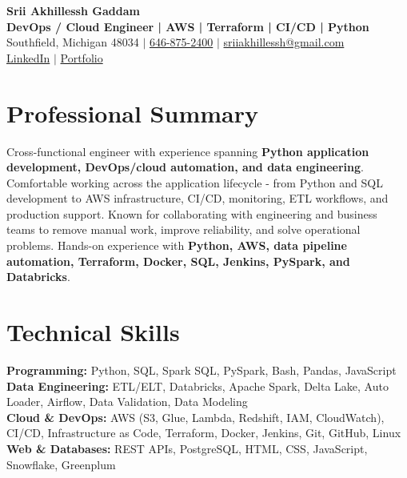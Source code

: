 \documentclass[letterpaper,10pt]{article}
\begin{document}
\fontsize{9.35pt}{10.45pt}\selectfont

\begin{center}
    {\LARGE \textbf{Srii Akhillessh Gaddam}} \\[-1pt]
    \textbf{DevOps / Cloud Engineer | AWS | Terraform | CI/CD | Python} \\[2pt]
    Southfield, Michigan 48034 $|$
    \href{tel:6468752400}{646-875-2400} $|$
    \href{mailto:sriiakhillessh@gmail.com}{sriiakhillessh@gmail.com} \\[1pt]
    \href{https://www.linkedin.com/in/srii-akhiilessh-gaddam-b48668191/}{LinkedIn} $|$
    \href{https://sriiakhillesshg.github.io/portfolio/}{Portfolio}
\end{center}
\vspace{-8pt}

\section{Professional Summary}
\small{Cross-functional engineer with experience spanning \textbf{Python application development, DevOps/cloud automation, and data engineering}. Comfortable working across the application lifecycle - from Python and SQL development to AWS infrastructure, CI/CD, monitoring, ETL workflows, and production support. Known for collaborating with engineering and business teams to remove manual work, improve reliability, and solve operational problems. Hands-on experience with \textbf{Python, AWS, data pipeline automation, Terraform, Docker, SQL, Jenkins, PySpark, and Databricks}.}

\section{Technical Skills}
\small{
\textbf{Programming:} Python, SQL, Spark SQL, PySpark, Bash, Pandas, JavaScript \\
\textbf{Data Engineering:} ETL/ELT, Databricks, Apache Spark, Delta Lake, Auto Loader, Airflow, Data Validation, Data Modeling \\
\textbf{Cloud \& DevOps:} AWS (S3, Glue, Lambda, Redshift, IAM, CloudWatch), CI/CD, Infrastructure as Code, Terraform, Docker, Jenkins, Git, GitHub, Linux \\
\textbf{Web \& Databases:} REST APIs, PostgreSQL, HTML, CSS, JavaScript, Snowflake, Greenplum
}
\end{document}
